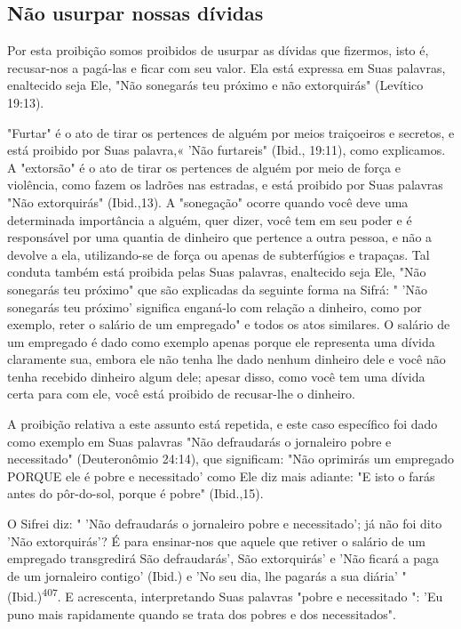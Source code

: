 \begin{itemize}
\begin{enumrate}
\begin{itemize}
\begin{itemize}
\begin{itemize}
\section{Não usurpar nossas dívidas}

Por esta proibição somos proibidos de usurpar as dívidas que fizer­mos,
isto é, recusar-nos a pagá-las e ficar com seu valor. Ela está expressa
em Suas palavras, enaltecido seja Ele, "Não sonegarás teu próximo e não
extorqui­rás" (Levítico 19:13).

"Furtar" é o ato de tirar os pertences de alguém por meios traiçoei­ros
e secretos, e está proibido por Suas palavra,« 'Não furtareis" (Ibid.,
19:11), como explicamos. A "extorsão" é o ato de tirar os pertences de
alguém por meio de força e violência, como fazem os ladrões nas
estradas, e está proibido por Suas palavras "Não extorquirás"
(Ibid.,13). A "sonegação" ocorre quando você deve uma determinada
importância a alguém, quer dizer, você tem em seu poder e é responsável
por uma quantia de dinheiro que pertence a outra pessoa, e não a devolve
a ela, utilizando-se de força ou apenas de subterfúgios e trapaças. Tal
conduta também está proibida pelas Suas palavras, enaltecido seja Ele,
"Não sonegarás teu próximo" que são explicadas da seguinte forma na
Sifrá: " 'Não sonegarás teu próximo' significa enganá-lo com relação a
di­nheiro, como por exemplo, reter o salário de um empregado" e todos os
atos similares. O salário de um empregado é dado como exemplo apenas
porque ele representa uma dívida claramente sua, embora ele não tenha
lhe dado ne­nhum dinheiro dele e você não tenha recebido dinheiro algum
dele; apesar dis­so, como você tem uma dívida certa para com ele, você
está proibido de recusar-lhe o dinheiro.

A proibição relativa a este assunto está repetida, e este caso
específi­co foi dado como exemplo em Suas palavras "Não defraudarás o
jornaleiro po­bre e necessitado" (Deuteronômio 24:14), que significam:
"Não oprimirás um empregado PORQUE ele é pobre e necessitado' como Ele
diz mais adiante: "E isto o farás antes do pôr-do-sol, porque é pobre"
(Ibid.,15).

O Sifrei diz: " 'Não defraudarás o jornaleiro pobre e necessitado'; já
não foi dito 'Não extorquirás'? É para ensinar-nos que aquele que
retiver o salá­rio de um empregado transgredirá São defraudarás', São
extorquirás' e 'Não ficará a paga de um jornaleiro contigo' (Ibid.) e
'No seu dia, lhe pagarás a sua diária' " 
(Ibid.)\textsuperscript{407}. E acrescenta, interpretando Suas
palavras "pobre e necessitado
": 'Eu puno mais rapidamente quando se trata dos pobres e dos
necessitados".



\end{itemize}
\end{itemize}
\end{itemize}
\end{enumrate}
\end{itemize}
